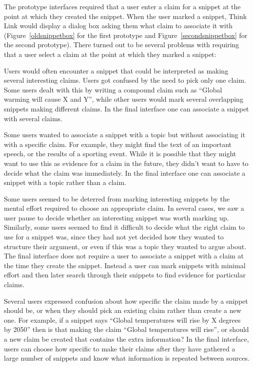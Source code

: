 \documentclass{chi2009}
\begin{document}
The prototype interfaces required that a user enter a claim for a snippet at the point at which they created the snippet. When the user marked a snippet, Think Link would display a dialog box asking them what claim to associate it with (Figure~\ref{oldsnippetbox} for the first prototype and Figure~\ref{secondsnippetbox} for the second prototype). There turned out to be several problems with requiring that a user select a claim at the point at which they marked a snippet:

Users would often encounter a snippet that could be interpreted as making several interesting claims. Users got confused by the need to pick only one claim. Some users dealt with this by writing a compound claim such as ``Global warming will cause X and Y'', while other users would mark several overlapping snippets making different claims. In the final interface one can associate a snippet with several claims.

Some users wanted to associate a snippet with a topic but without associating it with a specific claim. For example, they might find the text of an important speech, or the results of a sporting event. While it is possible that they might want to use this as evidence for a claim in the future, they didn't want to have to decide what the claim was immediately. In the final interface one can associate a snippet with a topic rather than a claim.

Some users seemed to be deterred from marking interesting snippets by the mental effort required to choose an appropriate claim. In several cases, we saw a user pause to decide whether an interesting snippet was worth marking up. Similarly, some users seemed to find it difficult to decide what the right claim to use for a snippet was, since they had not yet decided how they wanted to structure their argument, or even if this was a topic they wanted to argue about. The final interface does not require a user to associate a snippet with a claim at the time they create the snippet. Instead a user can mark snippets with minimal effort and then later search through their snippets to find evidence for particular claims.

Several users expressed confusion about how specific the claim made by a snippet should be, or when they should pick an existing claim rather than create a new one. For example, if a snippet says ``Global temperatures will rise by X degrees by 2050'' then is that making the claim ``Global temperatures will rise'', or should a new claim be created that contains the extra information? In the final interface, users can choose how specific to make their claims after they have gathered a large number of snippets and know what information is repeated between sources.
\end{document}
